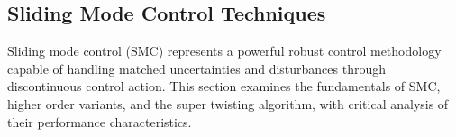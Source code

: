 

\subsection{Sliding Mode Control Techniques}

Sliding mode control (SMC) represents a powerful robust control methodology capable of handling matched uncertainties and disturbances through discontinuous control action. This section examines the fundamentals of SMC, higher order variants, and the super twisting algorithm, with critical analysis of their performance characteristics.


